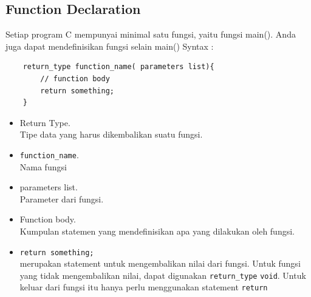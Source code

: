 \subsection{Function Declaration}
Setiap program C mempunyai minimal satu fungsi, yaitu fungsi main(). Anda juga dapat mendefinisikan fungsi selain main()
Syntax :
\begin{verbatim}
    return_type function_name( parameters list){
        // function body
    	return something;
    }
\end{verbatim}
\begin{itemize}
    \item Return Type.\\ Tipe data yang harus dikembalikan suatu fungsi.
    \item \verb*|function_name|.\\ Nama fungsi
    \item parameters list.\\
          Parameter dari fungsi.
    \item Function body.\\ Kumpulan statemen yang mendefinisikan apa yang dilakukan oleh fungsi.
    \item \verb|return something;|\\ merupakan statement untuk mengembalikan nilai dari fungsi. Untuk fungsi yang tidak mengembalikan nilai, dapat digunakan \verb|return_type| \verb|void|. Untuk keluar dari fungsi itu hanya perlu menggunakan statement \verb*|return|
\end{itemize}

